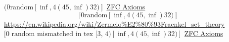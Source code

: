 $( 0 \text{random} [\inf, 4 ( 45, \inf) 32)]$
\href{https://en.wikipedia.org/wiki/Zermelo%E2%80%93Fraenkel_set_theory}{ZFC Axioms}
$$
[ 0 \text{random} [\inf, 4 
( 45, \inf) 32
)
]
$$
\url{https://en.wikipedia.org/wiki/Zermelo%E2%80%93Fraenkel_set_theory}
$[ 0 \text{ random mismatched in tex [3, 4)} [\inf, 4 ( 45, \inf) 32)]$
\href{https://en.wikipedia.org/wiki/Construction_of_the_real_numbers}{ZFC Axioms}
